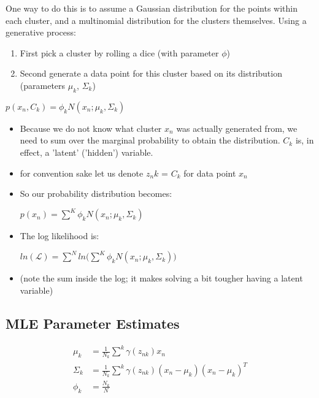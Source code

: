 \documentclass[]{article}
\begin{document}
One way to do this is to assume a Gaussian distribution for the points within each cluster, and a multinomial distribution for the clusters themselves. Using a generative process:

\begin{enumerate}
	\item First pick a cluster by rolling a dice (with parameter $\phi$)
	\item Second generate a data point for this cluster based on its distribution (parameters $\mu_k$, $\Sigma_k$) 
\end{enumerate}

\begin{center}
	$p(x_n, C_k) = \phi_k N(x_n ; \mu_k, \Sigma_k)$
\end{center}

\begin{itemize}
	\item Because we do not know what cluster $x_n$ was actually generated from, we need to sum over the marginal probability to obtain the distribution. $C_k$ is, in effect, a 'latent' ('hidden') variable.
	\item for convention sake let us denote $z_nk$ = $C_k$ for data point $x_n$
	\item So our probability distribution becomes:

	\begin{center}
		$p(x_n) = \sum^K \phi_k N(x_n ; \mu_k, \Sigma_k)$
	\end{center}
	
	\item The log likelihood is:
	
	\begin{center}
		$ln (\mathcal{L}) = \sum^N ln \big( \sum^K \phi_k N(x_n ; \mu_k, \Sigma_k) \big)$
	\end{center}
	\item (note the sum inside the log; it makes solving a bit tougher having a latent variable)
\end{itemize}

\subsection{MLE Parameter Estimates}
\begin{align}
\mu_k &= \frac{1}{N_k}\sum^k \gamma(z_{nk}) x_n \\
\Sigma_k &= \frac{1}{N_k}\sum^k \gamma(z_{nk}) (x_n-\mu_k)(x_n-\mu_k)^T \\
\phi_k &= \frac{N_k}{N}
\end{align}
\end{document}
